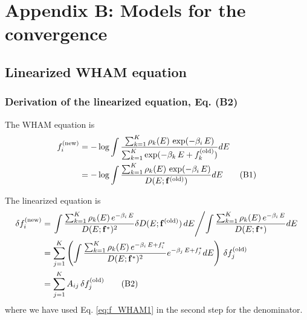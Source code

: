 \documentclass[aip,jcp,preprint,notitlepage, superscriptaddress]{revtex4-1}
\begin{document}
\section{Appendix B: Models for the convergence}






\subsection{Linearized WHAM equation}


\subsubsection{Derivation of the linearized equation, Eq. (B2)}



The WHAM equation is
%
\begin{align}
f_i^\mathrm{(new)}
&=
-\log
\int
\frac
{
  \sum_{k=1}^K \rho_k(E) \, \exp(-\beta_i \, E)
}
{
  \sum_{k=1}^K
  \exp(
    -\beta_k \, E + f_k^\mathrm{(old)}
  )
}
dE
\notag \\
&=
-\log
\int
\frac
{
  \sum_{k=1}^K \rho_k(E) \, \exp(-\beta_i \, E)
}
{
  D(E; \mathbf{f}^\mathrm{(old)})
}
dE
\tag{B1}
\label{eq:f_WHAM1}
\end{align}



The linearized equation is
\begin{align}
\delta f_i^\mathrm{(new)}
&=
\left.
  \int
  \frac
  {
    \sum_{k=1}^K \rho_k(E) \, e^{-\beta_i \, E}
  }
  {
    D(E; \vct f^*)^2
  }
  \delta D(E; \vct f^\mathrm{(old)}) \,
  dE
\middle/
  \int
  \frac
  {
    \sum_{k=1}^K \rho_k(E) \, e^{-\beta_i \, E}
  }
  {
    D(E; \vct f^*)
  }
  dE
\right.
%
\notag \\
&=
\sum_{j = 1}^K
\left(
\int
\frac
{
  \sum_{k=1}^K \rho_k(E) \, e^{-\beta_i \, E + f_i^*}
}
{
  D(E; \vct f^*)^2
}
e^{-\beta_j \, E + f_j^*}
dE
\right)
\, \delta f_j^\mathrm{(old)}
\notag \\
&=
\sum_{j = 1}^K
A_{ij} \, \delta f_j^\mathrm{(old)}
\tag{B2}
\label{eq:f_lin}
\end{align}
where we have used
Eq. \eqref{eq:f_WHAM1}
in the second step
for the denominator.
\end{document}
